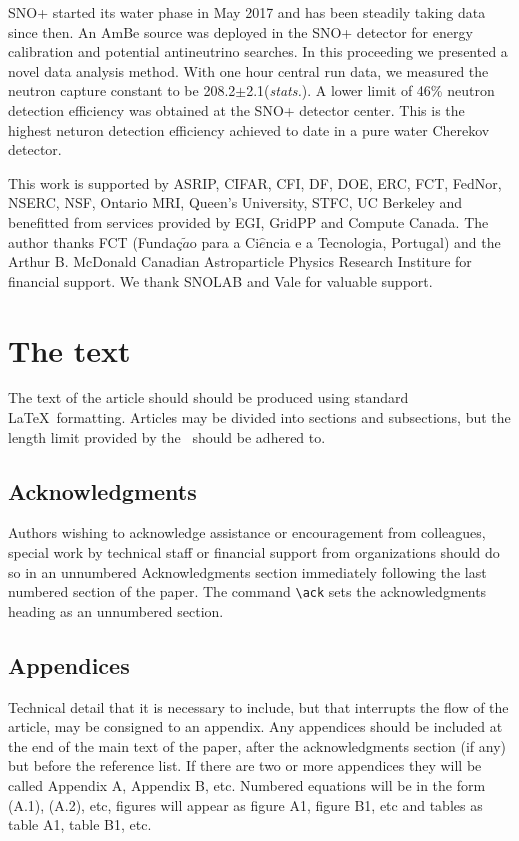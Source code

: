 \documentclass[a4paper]{jpconf}
\begin{document}
SNO+ started its water phase in May 2017 and has been steadily taking data since then. An AmBe source was deployed in the SNO+ detector for energy calibration and potential antineutrino searches. In this proceeding we presented a novel data analysis method. With one hour central run data, we measured the neutron capture constant to be 208.2$\pm$2.1(\textit{stats.}). A lower limit of 46\% neutron detection efficiency was obtained at the SNO+ detector center. This is the highest neturon detection efficiency achieved to date in a pure water Cherekov detector. 


\ack{}

This work is supported by ASRIP, CIFAR, CFI, DF, DOE, ERC, FCT, FedNor, NSERC, NSF, Ontario MRI, Queen's University, STFC, UC Berkeley and benefitted from services provided by EGI, GridPP and Compute Canada. The author thanks FCT (Funda\c{c}$\tilde{a}$o para a Ci$\hat{e}$ncia e a Tecnologia, Portugal) and the Arthur B. McDonald Canadian Astroparticle Physics Research Institure for financial support. We thank SNOLAB and Vale for valuable support.

\iffalse
\section{The text}
The text of the article should should be produced using standard \LaTeX\ formatting. Articles may be divided into sections and subsections, but the length limit provided by the \corg\ should be adhered to.

\subsection{Acknowledgments}
Authors wishing to acknowledge assistance or encouragement from 
colleagues, special work by technical staff or financial support from 
organizations should do so in an unnumbered Acknowledgments section 
immediately following the last numbered section of the paper. The 
command \verb"\ack" sets the acknowledgments heading as an unnumbered
section.

\subsection{Appendices}
Technical detail that it is necessary to include, but that interrupts 
the flow of the article, may be consigned to an appendix. 
Any appendices should be included at the end of the main text of the paper, after the acknowledgments section (if any) but before the reference list.
If there are two or more appendices they will be called Appendix A, Appendix B, etc. 
Numbered equations will be in the form (A.1), (A.2), etc,
figures will appear as figure A1, figure B1, etc and tables as table A1,
table B1, etc.
\end{document}

